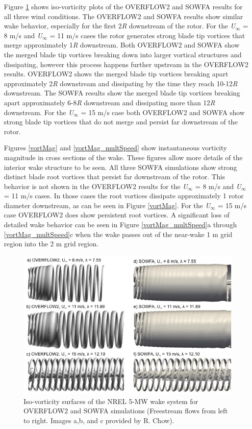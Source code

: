 Figure \ref{isoVort} shows iso-vorticity plots of the OVERFLOW2 and SOWFA results for all three wind conditions. The OVERFLOW2 and SOWFA results show similar wake behavior, especially for the first 2\emph{R} downstream of the rotor. For the \emph{U$_{\infty}$}  = 8 m/s and \emph{U$_{\infty}$}  = 11 m/s cases the rotor generates strong blade tip vortices that merge approximately 1\emph{R} downstream. Both OVERFLOW2 and SOWFA show the merged blade tip vortices breaking down into larger vortical structures and dissipating, however this process happens further upstream in the OVERFLOW2 results. OVERFLOW2 shows the merged blade tip vortices breaking apart approximately 2\emph{R} downstream and dissipating by the time they reach 10-12\emph{R} downstream. The SOWFA results show the merged blade tip vortices breaking apart approximately 6-8\emph{R} downstream and dissipating more than 12\emph{R} downstream. For the \emph{U$_{\infty}$}  = 15 m/s case both OVERFLOW2 and SOWFA show strong blade tip vortices that do not merge and persist far downstream of the rotor.




Figures \ref{vortMag} and \ref{vortMag_multSpeed} show instantaneous vorticity magnitude in cross sections of the wake. These figures allow more details of the interior wake structure to be seen. All three SOWFA simulations show strong distinct blade root vortices that persist far downstream of the rotor. This behavior is not shown in the OVERFLOW2 results for the \emph{U$_{\infty}$}  = 8 m/s and \emph{U$_{\infty}$}  = 11 m/s cases. In those cases the root vortices dissipate approximately 1 rotor diameter downstream, as can be seen in Figure \ref{vortMag}. For the \emph{U$_{\infty}$}  = 15 m/s case OVERFLOW2 does show persistent root vortices. A significant loss of detailed wake behavior can be seen in Figure \ref{vortMag_multSpeed}a through \ref{vortMag_multSpeed}c when the wake passes out of the near-wake 1 m grid region into the 2 m grid region. 



\begin{figure}[htbp]
\centering
 \includegraphics[width=\textwidth]{Figures/ch5Figures/isoVorts}
 \caption{ Iso-vorticity surfaces of the NREL 5-MW wake system for OVERFLOW2 and SOWFA simulations (Freestream flows from left to right. Images a,b, and c provided by R. Chow).}
 \label{isoVort}
\end{figure}   

